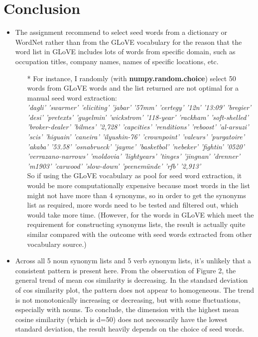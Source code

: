 \documentclass{article} %
\begin{document}
	



\section{Conclusion}

\begin{itemize}
		
	\item The assignment recommend to select seed words from a dictionary or
	WordNet rather than from the GLoVE\cite{pennington2014glove} vocabulary for the reason that 
	the word list in GLoVE includes lots of words from specific domain, such as occupation titles, company names, names of specific locations, etc. 
	\begin{itemize}
		\item[*] For instance, I randomly (with \textbf{numpy.random.choice}) select 50 words from GLoVE words and the list returned are not optimal for a manual seed word extraction:\\
		
		\textit{'dagli' 'swarmer' 'eliciting' 'jabar' '57mm' 'certegy' '12n' '13:09'
			'bregier' 'desi' 'pretexts' 'gugelmin' 'wickstrom' '118-year' 'rackham'
			'soft-shelled' 'broker-dealer' 'bilmes' '2,728' 'capcities' 'renditions'
			'reboost' 'al-arsuzi' 'scis' 'higuain' 'caneira' 'ilyushin-76'
			'crownpoint' 'valeurs' 'purgatoire' 'akaba' '53.58' 'osnabrueck' 'jayme'
			'basketbol' 'nebeker' 'fightin' '0520' 'verrazano-narrows' 'moldovia'
			'lightyears' 'tinges' 'jingnan' 'drenner' 'm1903' 'carwood' 'slow-down'
			'peenemünde' 'rfb' '2,913'}\\
		
		So if using the GLoVE vocabulary as pool for seed word extraction, it would be more computationally expensive because most words in the list might not have more than 4 synonyms, so in order to get the synonyms list as required, more words need to be tested and filtered out, which would take more time. (However, for the words in GLoVE which meet the requirement for constructing synonyms lists, the result is actually quite similar compared with the outcome with seed words extracted from other vocabulary source.)
	\end{itemize} 
	
	
	
	\item Across all 5 noun synonym lists and 5 verb synonym lists, it's unlikely that a consistent pattern is present here. From the observation of Figure 2, the general trend of mean cos similarity is decreasing. In the standard deviation of cos similarity plot, the pattern does not appear to homogeneous. The trend is not monotonically increasing or decreasing, but with some fluctuations, especially with nouns. To conclude, the dimension with the highest mean cosine similarity (which is d=50) does not necessarily have the lowest standard deviation, the result heavily depends on the choice of seed words.\\
	

\end{itemize}
\end{document}
